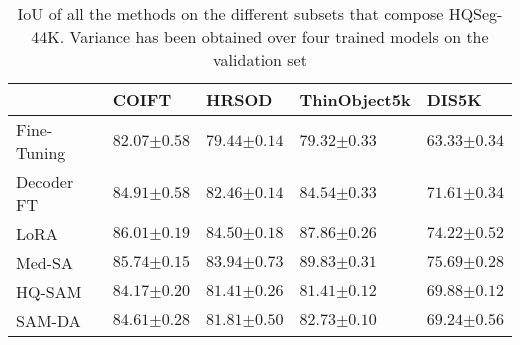 \begin{table*}[]
\centering
\caption{IoU of all the methods on the different subsets that compose HQSeg-44K. Variance has been obtained over four trained models on the validation set}
\label{tab:hqseg_results}
\begin{tabular}{@{}lP{2.2cm}P{2.2cm}P{2.2cm}P{2.2cm}@{}}
\toprule
 & COIFT & HRSOD & ThinObject5k & DIS5K \\ \midrule
Fine-Tuning & $82.07{\scriptscriptstyle \pm 0.58}$ & $79.44{\scriptscriptstyle \pm 0.14}$ & $79.32{\scriptscriptstyle \pm 0.33}$ & $63.33{\scriptscriptstyle \pm 0.34}$ \\
Decoder FT & $84.91{\scriptscriptstyle \pm 0.58}$ & $82.46{\scriptscriptstyle \pm 0.14}$ & $84.54{\scriptscriptstyle \pm 0.33}$ & $71.61{\scriptscriptstyle \pm 0.34}$ \\
LoRA & $86.01{\scriptscriptstyle \pm 0.19}$ & $84.50{\scriptscriptstyle \pm 0.18}$ & $87.86{\scriptscriptstyle \pm 0.26}$ & $74.22{\scriptscriptstyle \pm 0.52}$ \\
Med-SA & $85.74{\scriptscriptstyle \pm 0.15}$ & $83.94{\scriptscriptstyle \pm 0.73}$ & $89.83{\scriptscriptstyle \pm 0.31}$ & $75.69{\scriptscriptstyle \pm 0.28}$ \\
HQ-SAM & $84.17{\scriptscriptstyle \pm 0.20}$ & $81.41{\scriptscriptstyle \pm 0.26}$ & $81.41{\scriptscriptstyle \pm 0.12}$ & $69.88{\scriptscriptstyle \pm 0.12}$ \\ \midrule
SAM-DA & $84.61{\scriptscriptstyle \pm 0.28}$ & $81.81{\scriptscriptstyle \pm 0.50}$ & $82.73{\scriptscriptstyle \pm 0.10}$ & $69.24{\scriptscriptstyle \pm 0.56}$ \\ \bottomrule
\end{tabular}

\end{table*}
